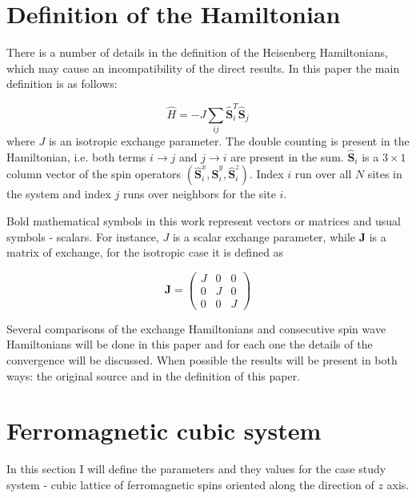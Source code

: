 \documentclass[a4paper,12pt]{article}
\begin{document}
\section{Definition of the Hamiltonian}

There is a number of details in the definition of the Heisenberg Hamiltonians, which may cause an incompatibility of the direct results. 
In this paper the main definition is as follows:

\begin{equation}
    \hat{H} = -J \sum_{ij} \hat{\mathbf{S}}_i^T \hat{\mathbf{S}}_j
    \label{eq:hh-main}
\end{equation}
where $J$ is an isotropic exchange parameter. The double counting is present in the Hamiltonian, i.e. both terms $i\rightarrow j$ and $j \rightarrow i$ are present in the sum. 
$\hat{\mathbf{S}}_i$ is a $3\times1$ column vector of the spin operators $(\hat{\mathbf{S}}_i^x, \hat{\mathbf{S}}_i^y, \hat{\mathbf{S}}_i^z)$. 
Index $i$ run over all $N$ sites in the system and index $j$ runs over neighbors for the site $i$. 

Bold mathematical symbols in this work represent vectors or matrices and usual symbols - scalars. For instance, $J$ is a scalar exchange parameter, while $\mathbf{J}$ is a matrix of exchange, 
for the isotropic case it is defined as

\begin{equation}
    \mathbf{J} =
    \begin{pmatrix}
        J & 0 & 0 \\
        0 & J & 0 \\
        0 & 0 & J
    \end{pmatrix}
\end{equation}

Several comparisons of the exchange Hamiltonians and consecutive spin wave Hamiltonians will be done in this paper and for each one the details of the convergence will be discussed. 
When possible the results will be present in both ways: the original source and in the definition of this paper.

\section{Ferromagnetic cubic system}

In this section I will define the parameters and they values for the case study system - 
cubic lattice of ferromagnetic spins oriented along the direction of $z$ axis.
\end{document}
